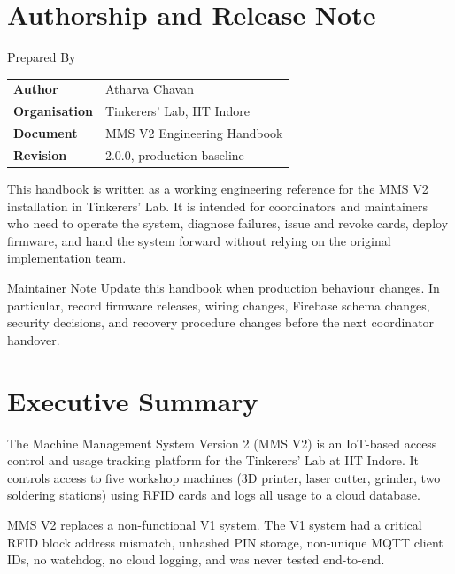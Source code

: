 \documentclass[12pt,a4paper,twoside]{report}
\begin{document}
\clearpage
\chapter*{Authorship and Release Note}

\begin{controlbox}{Prepared By}
\begin{tabular}{ll}
\textbf{Author} & Atharva Chavan \\
\textbf{Organisation} & Tinkerers' Lab, IIT Indore \\
\textbf{Document} & MMS V2 Engineering Handbook \\
\textbf{Revision} & 2.0.0, production baseline \\
\end{tabular}
\end{controlbox}

This handbook is written as a working engineering reference for the MMS V2 installation in Tinkerers' Lab. It is intended for coordinators and maintainers who need to operate the system, diagnose failures, issue and revoke cards, deploy firmware, and hand the system forward without relying on the original implementation team.

\begin{controlbox}{Maintainer Note}
Update this handbook when production behaviour changes. In particular, record firmware releases, wiring changes, Firebase schema changes, security decisions, and recovery procedure changes before the next coordinator handover.
\end{controlbox}

\clearpage
\chapter*{Executive Summary}

The Machine Management System Version 2 (MMS V2) is an IoT-based access control and usage tracking platform for the Tinkerers' Lab at IIT Indore. It controls access to five workshop machines (3D printer, laser cutter, grinder, two soldering stations) using RFID cards and logs all usage to a cloud database.

MMS V2 replaces a non-functional V1 system. The V1 system had a critical RFID block address mismatch, unhashed PIN storage, non-unique MQTT client IDs, no watchdog, no cloud logging, and was never tested end-to-end.
\end{document}
